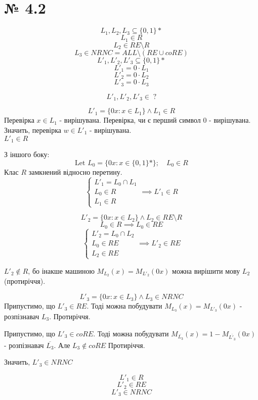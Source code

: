 \documentclass[11pt, a4paper]{article} %
\begin{document}
\section*{№ 4.2}
\begin{mdframed}
    \begin{multicols*}{2}
        $$L_1,L_2,L_3 \subseteq \{0,1\}*$$
        $$L_1 \in R$$
        $$L_2 \in RE \setminus R$$
        $$L_3 \in NRNC = ALL \setminus (RE \cup coRE)$$
    \columnbreak
        $$L'_1, L'_2, L'_3 \subseteq \{0,1\}*$$
        $$L'_1 = 0 \cdot L_1$$
        $$L'_2 = 0 \cdot L_2$$
        $$L'_3 = 0 \cdot L_3$$
    \end{multicols*}
$$L'_1, L'_2, L'_3 \in \; ?$$
\end{mdframed}

$$L'_1 = \{0x : x\in L_1\} \wedge L_1 \in R$$
Перевірка $x \in L_1$ - вирішувана. Перевірка, чи є перший символ 0 - вирішувана.
Значить, перевірка $w \in L'_1$ - вирішувана.\\
$L'_1 \in R$

З іншого боку:
$$\text{Let } L_0 = \{0x : x \in \{0,1\}*\};\quad L_0 \in R$$
Клас $R$ замкнений відносно перетину.
$$\begin{cases}
    L'_1 = L_0 \cap L_1\\
    L_0 \in R\\
    L_1 \in R
\end{cases} \implies L'_1 \in R$$

$$L'_2 = \{0x : x\in L_2\} \wedge L_2 \in RE\setminus R$$
$$L_0 \in R \implies L_0 \in RE$$
$$\begin{cases}
    L'_2 = L_0 \cap L_2\\
    L_0 \in RE\\
    L_2 \in RE
\end{cases} \implies L'_2 \in RE$$

$L'_2 \notin R$, бо інакше машиною $M_{L_2}(x) = M_{L'_2}(0x)$ можна вирішити мову $L_2$ (протиріччя).


$$L'_3 = \{0x : x\in L_3\} \wedge L_3 \in NRNC$$
Припустимо, що $L'_3 \in RE$.
Тоді можна побудувати $M_{L_3}(x) = M_{L'_3}(0x)$ - розпізнавач $L_3$. Протиріччя. 

Припустимо, що $L'_3 \in coRE$.
Тоді можна побудувати $M_{\overline{L_3}}(x) = 1 - M_{\overline{L'_3}}(0x)$ - розпізнавач $\overline{L_3}$. 
Але $L_3 \notin coRE$ Протиріччя.

Значить, $L'_3 \in NRNC$

\begin{mdframed}[style=ans]
    $$L'_1 \in R$$
    $$L'_2 \in RE$$
    $$L'_3 \in NRNC$$
\end{mdframed}
\end{document}
